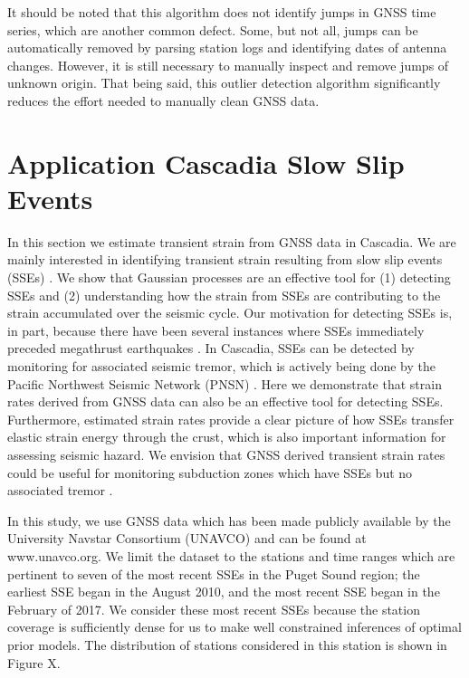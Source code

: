 \documentclass[10pt,a4paper]{article}
\begin{document}
It should be noted that this algorithm does not identify jumps in GNSS time series, which are another common defect. Some, but not all, jumps can be automatically removed by parsing station logs and identifying dates of antenna changes. However, it is still necessary to manually inspect and remove jumps of unknown origin. That being said, this outlier detection algorithm significantly reduces the effort needed to manually clean GNSS data.       

\section{Application Cascadia Slow Slip Events}\label{sec:Cascadia}
In this section we estimate transient strain from GNSS data in Cascadia. We are mainly interested in identifying transient strain resulting from slow slip events (SSEs) \citep[e.g.,][]{Dragert2001}. We show that Gaussian processes are an effective tool for (1) detecting SSEs and (2) understanding how the strain from SSEs are contributing to the strain accumulated over the seismic cycle. Our motivation for detecting SSEs is, in part, because there have been several instances where SSEs immediately preceded megathrust earthquakes \citep{Roeloffs2006}.  In Cascadia, SSEs can be detected by monitoring for associated seismic tremor, which is actively being done by the Pacific Northwest Seismic Network (PNSN) \citep{Wech2010}. 
Here we demonstrate that strain rates derived from GNSS data can also be an effective tool for detecting SSEs. Furthermore, estimated strain rates provide a clear picture of how SSEs transfer elastic strain energy through the crust, which is also important information for assessing seismic hazard. We envision that GNSS derived transient strain rates could be useful for monitoring subduction zones which have SSEs but no associated tremor \citep{Schwartz2007}.

In this study, we use GNSS data which has been made publicly available by the University Navstar Consortium (UNAVCO) \citep{Herring2016} and can be found at www.unavco.org.  We limit the dataset to the stations and time ranges which are pertinent to seven of the most recent SSEs in the Puget Sound region; the earliest SSE began in the August 2010, and the most recent SSE began in the February of 2017. We consider these most recent SSEs because the station coverage is sufficiently dense for us to make well constrained inferences of optimal prior models.  The distribution of stations considered in this station is shown in Figure X. 
\end{document}
